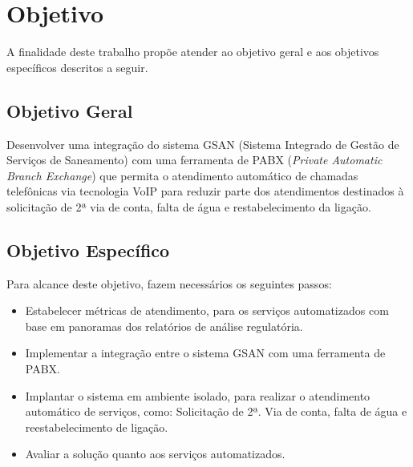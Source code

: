 \section*{Objetivo}

A finalidade deste trabalho propõe atender ao objetivo geral e aos objetivos específicos descritos a seguir.

\subsection*{Objetivo Geral}

Desenvolver uma integração do sistema GSAN (Sistema Integrado de Gestão de Serviços de Saneamento) com uma ferramenta de PABX (\textit{Private Automatic Branch Exchange}) que permita o atendimento automático de chamadas telefônicas via tecnologia VoIP para reduzir parte dos atendimentos destinados à solicitação de 2ª via de conta, falta de água e restabelecimento da ligação.

\subsection*{Objetivo Específico}
Para alcance deste objetivo, fazem necessários os seguintes passos:
\begin{itemize}
	\item Estabelecer métricas de atendimento, para os serviços automatizados com base em panoramas dos relatórios de análise regulatória. 
	\item Implementar a integração entre o sistema GSAN com uma ferramenta de PABX.
	\item Implantar o sistema em ambiente isolado, para realizar o atendimento automático de serviços, como: Solicitação de 2ª. Via de conta, falta de água e reestabelecimento de ligação.
	\item Avaliar a solução quanto aos serviços automatizados.
\end{itemize}